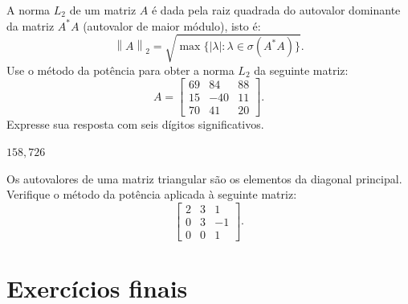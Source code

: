 \begin{exer} A norma $L_2$ de um matriz $A$  é dada pela raiz quadrada do autovalor dominante da matriz $A^*A$ (autovalor de maior módulo), isto é: $$\left\|A\right\|_2=\sqrt{\max\{|\lambda|: \lambda\in\sigma(A^*A)\}}.$$
Use o método da potência para obter a norma $L_2$ da seguinte matriz:
$$A=\left[\begin{array}{ccc}

    69&    84&    88\\
    15&  - 40&    11\\
    70&    41&    20
\end{array}\right].
$$
Expresse sua resposta com seis dígitos significativos.
\end{exer}
\begin{resp}
$158,726$
\end{resp}


\begin{exer} Os autovalores de uma matriz triangular são os elementos da diagonal principal. Verifique o método da potência aplicada à seguinte matriz:
$$
\left[\begin{array}{ccc}
2&3&1\\
0&3&-1\\
0&0&1
\end{array}\right].
$$
\end{exer}
\begin{resp}
  \construirResp
\end{resp}

\section{Exercícios finais}

